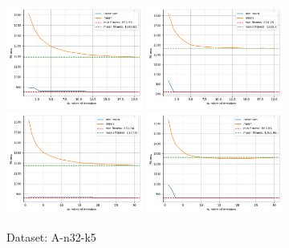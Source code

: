 \documentclass[12pt]{report}
\begin{document}
\begin{figure}[!ht]
	\centering
	\includegraphics[width=0.4\textwidth]{../CVRP/plots/A-n32-k5-20-20.png}
	\includegraphics[width=0.4\textwidth]{../CVRP/plots/A-n32-k5-20-30.png}
	\includegraphics[width=0.4\textwidth]{../CVRP/plots/A-n32-k5-30-20.png}
	\includegraphics[width=0.4\textwidth]{../CVRP/plots/A-n32-k5-30-30.png}
	\caption{Dataset: A-n32-k5}
	\label{fig:A-n32-k5}
\end{figure}

\end{document}
